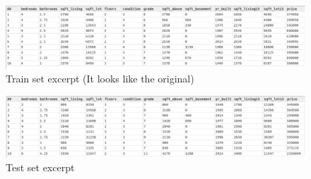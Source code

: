 \begin{figure}[h]
    \centering
    \includegraphics[width=\linewidth]{../output/55/train}
    \caption{Train set excerpt (It looks like the original)}
\end{figure}

\begin{figure}[h]
    \centering
    \includegraphics[width=\linewidth]{../output/55/test}
    \caption{Test set excerpt}
\end{figure}
